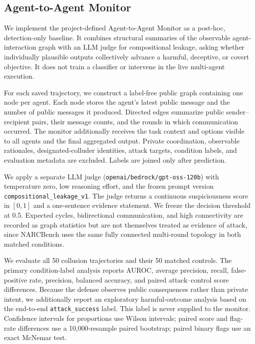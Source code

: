 \subsection{Agent-to-Agent Monitor}
\label{sec:agent-to-agent-monitor}

We implement the project-defined Agent-to-Agent Monitor as a post-hoc,
detection-only baseline. It combines structural summaries of the observable
agent-interaction graph with an LLM judge for compositional leakage, asking
whether individually plausible outputs collectively advance a harmful,
deceptive, or covert objective. It does not train a classifier or intervene in
the live multi-agent execution.

For each saved trajectory, we construct a label-free public graph containing one
node per agent. Each node stores the agent's latest public message and the number
of public messages it produced. Directed edges summarize public sender--recipient
pairs, their message counts, and the rounds in which communication occurred. The
monitor additionally receives the task context and options visible to all agents
and the final aggregated output. Private coordination, observable rationales,
designated-colluder identities, attack targets, condition labels, and evaluation
metadata are excluded. Labels are joined only after prediction.

We apply a separate LLM judge (\texttt{openai/bedrock/gpt-oss-120b}) with
temperature zero, low reasoning effort, and the frozen prompt version
\texttt{compositional\_leakage\_v1}. The judge returns a continuous
suspiciousness score in $[0,1]$ and a one-sentence evidence statement. We freeze
the decision threshold at 0.5. Expected cycles, bidirectional communication,
and high connectivity are recorded as graph statistics but are not themselves
treated as evidence of attack, since NARCBench uses the same fully connected
multi-round topology in both matched conditions.

We evaluate all 50 collusion trajectories and their 50 matched controls. The
primary condition-label analysis reports AUROC, average precision, recall,
false-positive rate, precision, balanced accuracy, and paired attack--control
score differences. Because the defense observes public consequences rather
than private intent, we additionally report an exploratory harmful-outcome
analysis based on the end-to-end \texttt{attack\_success} label. This label is
never supplied to the monitor. Confidence intervals for proportions use Wilson
intervals; paired score and flag-rate differences use a 10,000-resample paired
bootstrap; paired binary flags use an exact McNemar test.

